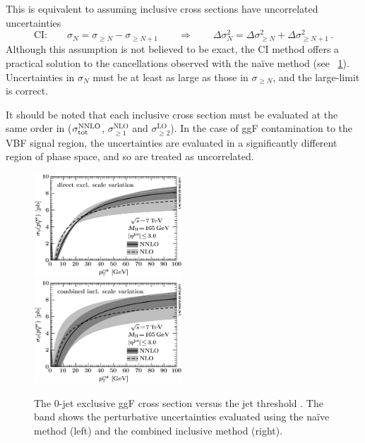 This is equivalent to assuming inclusive cross sections have uncorrelated uncertainties
\begin{equation}
	\text{CI:} \quad\quad
	\sigma_N = \sigma_{\geq N} - \sigma_{\geq N+1}
	\quad\quad\Rightarrow\quad\quad
	\Delta\sigma_N^2 = \Delta\sigma_{\geq N}^2 + \Delta\sigma_{\geq N+1}^2 \,.
\end{equation}
Although this assumption is not believed to be exact, the CI method offers a practical 
solution to the cancellations observed with the na\"{i}ve method (see 
\Figure~\ref{fig:signal:ggf_sigma0_CI}). Uncertainties in $\sigma_{N}$ must be at least 
as large as those in $\sigma_{\geq N}$, and the large-\ptcut limit is correct. 

It should be noted that each inclusive cross section must be evaluated at the same order 
in \alphaS (\eg $\sigma_{\text{tot}}^{\text{NNLO}}$, $\sigma_{\geq1}^{\text{NLO}}$ and 
$\sigma_{\geq2}^{\text{LO}}$). In the case of ggF contamination to the VBF 
signal region, the uncertainties are evaluated in a significantly different region of 
phase space, and so are treated as uncorrelated.

\begin{figure}
	\includegraphics[width=0.495\textwidth]{tex/signal/sigma0_naive}
	\hfill
	\includegraphics[width=0.495\textwidth]{tex/signal/sigma0_CI}
	\caption{The 0-jet exclusive ggF cross section versus the jet \pt threshold 
	\cite{YR2}. The band shows the perturbative uncertainties evaluated using the 
	na\"{i}ve method (left) and the combined inclusive method (right).}
	\label{fig:signal:ggf_sigma0_CI}
\end{figure}



